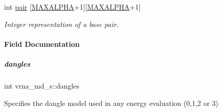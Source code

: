 \begin{DoxyCompactItemize}
\mbox{\label{group__model__details_ab4da594c638707e212f64aadb54a7454}} 
int \hyperlink{group__model__details_ab4da594c638707e212f64aadb54a7454}{pair} \mbox{[}\hyperlink{group__model__details_ga05a5ffe718aa431d97419a12fb082379}{M\+A\+X\+A\+L\+P\+HA}+1\mbox{]}\mbox{[}\hyperlink{group__model__details_ga05a5ffe718aa431d97419a12fb082379}{M\+A\+X\+A\+L\+P\+HA}+1\mbox{]}
\begin{DoxyCompactList}\small\item\em Integer representation of a base pair. \end{DoxyCompactList}\end{DoxyCompactItemize}


\paragraph{Field Documentation}
\mbox{\label{group__model__details_adcda4ff2ea77748ae0e8700288282efc}} 
\subparagraph{\texorpdfstring{dangles}{dangles}}
{\footnotesize\ttfamily int vrna\+\_\+md\+\_\+s\+::dangles}



Specifies the dangle model used in any energy evaluation (0,1,2 or 3) 


